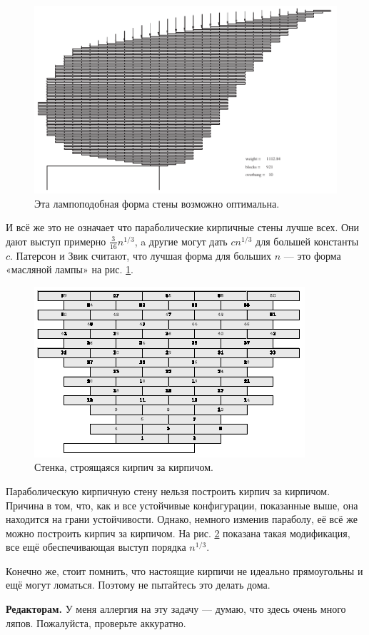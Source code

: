 \begin{figure}[htb!]
\centering
\includegraphics[scale=1]{pics/kirpich8}
\caption{Эта лампоподобная форма стены возможно оптимальна.}
\label{pic:kirpich8}
\end{figure}

И всё же это не означает что параболические кирпичные стены лучше всех.
Они дают выступ примерно $\tfrac3{16}n^{1/3}$, a другие могут дать $cn^{1/3}$ для большей константы $c$.
Патерсон и Звик считают, что лучшая форма для больших $n$ --- это форма «масляной лампы» на рис. \ref{pic:kirpich8}.

\begin{figure}[htb!]
\centering
\includegraphics[scale=1]{pics/kirpich9}
\caption{Стенка, строящаяся кирпич за кирпичом.}
\label{pic:kirpich9}
\end{figure}

Параболическую кирпичную стену нельзя построить кирпич за кирпичом.
Причина в том, что, как и все устойчивые конфигурации, показанные выше, она находится на грани устойчивости.
Однако, немного изменив параболу, её всё же можно построить кирпич за кирпичом.
На рис. \ref{pic:kirpich9} показана такая модификация, все ещё обеспечивающая выступ порядка $n^{1/3}$.

Конечно же, стоит помнить, что настоящие кирпичи не идеально прямоугольны и ещё могут ломаться.
Поэтому не пытайтесь это делать дома.

\begin{addedbytheeditors}
\textbf{Редакторам.}
У меня аллергия на эту задачу --- думаю, что здесь очень много ляпов. Пожалуйста, проверьте аккуратно.
\end{addedbytheeditors}

